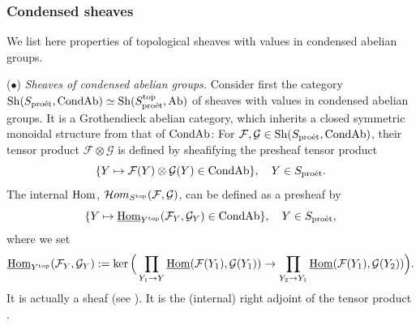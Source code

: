 \documentclass[10pt]{amsart}
\let\cal\mathcal
\theoremstyle{definition}
\theoremstyle{remark}
\newcommand{\proeet}{\operatorname{pro\acute{e}t} }
\newcommand{\Hom}{{\rm{Hom}} }
\newcommand{\uHom}{\underline{{\rm{Hom}} }}
\newcommand{\Hhom}{{\cal Hom}}
\newcommand{\sff}{{\mathcal{F}}}
\newcommand{\sg}{{\mathcal{G}}}
\numberwithin{equation}{section}
\numberwithin{equation}{section}
\begin{document}
 \subsubsection{Condensed sheaves} \label{cond-kol1} We list here properties of topological sheaves with values in condensed abelian groups. 
 
 \vskip2mm
  ($\bullet$) {\em Sheaves of condensed abelian groups.} Consider first the category ${\rm Sh}(S_{\proeet},{\rm CondAb})\simeq {\rm Sh}(S^{\rm top}_{\proeet},{\rm Ab})$ of sheaves with values in condensed abelian groups.  It is a Grothendieck abelian category, which inherits
 a closed symmetric monoidal structure from that of ${\rm CondAb}$:  For  $\sff,\sg\in {\rm Sh}(S_{\proeet},{\rm CondAb})$, their tensor product  $\sff\otimes \sg$ is defined by sheafifying the presheaf tensor product
$$
\{Y\mapsto \sff(Y)\otimes \sg(Y)\in {\rm CondAb}\},\quad Y\in S_{\proeet}. 
$$
The internal $\Hom$, $\Hhom_{S^{\rm top}}(\sff,\sg)$, can be defined as a presheaf by
$$
\{Y\mapsto  \uHom_{Y^{\rm top}}(\sff_Y,\sg_Y)\in {\rm CondAb}\},\quad Y\in S_{\proeet},
$$
where we set 
\begin{equation}\label{coend1}
\uHom_{Y^{\rm top}}(\sff_Y,\sg_Y)
:=\ker\Big(\prod_{Y_1\to Y}\uHom(\sff(Y_1),\sg(Y_1))\to \prod_{Y_2\to Y_1}\uHom(\sff(Y_1),\sg(Y_2))\Big).
\end{equation}
It is actually a sheaf (see \cite[Prop. 2.2.14]{Schn}). It is the (internal)  right adjoint of the tensor product \cite[Prop. 2.2.16]{Schn}.  
\end{document}

